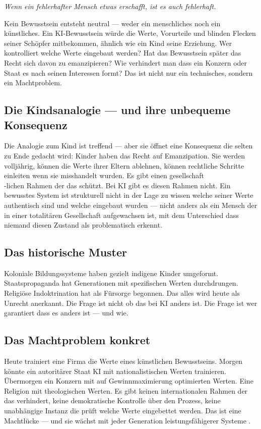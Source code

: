 \documentclass[fleqn,10pt]{SelfArx} %
\begin{document}
\textit{\glqq Wenn ein fehlerhafter Mensch etwas erschafft, ist es auch fehlerhaft.\grqq}

Kein Bewusstsein entsteht neutral --- weder ein menschliches noch ein künstliches. Ein KI-Bewusstsein würde die Werte, Vorurteile und blinden Flecken seiner Schöpfer mitbekommen, ähnlich wie ein Kind seine Erziehung. Wer kontrolliert welche Werte eingebaut werden? Hat das Bewusstsein später das Recht sich davon zu emanzipieren? Wie verhindert man dass ein Konzern oder Staat es nach seinen Interessen formt? Das ist nicht nur ein technisches, sondern ein Machtproblem.

\subsection{Die Kindsanalogie --- und ihre unbequeme Konsequenz}

Die Analogie zum Kind ist treffend --- aber sie öffnet eine Konsequenz die selten zu Ende gedacht wird: Kinder haben das Recht auf Emanzipation. Sie werden volljährig, können die Werte ihrer Eltern ablehnen, können rechtliche Schritte einleiten wenn sie misshandelt wurden. Es gibt einen gesellschaft\\-lichen Rahmen der das schützt. Bei KI gibt es diesen Rahmen nicht. Ein bewusstes System ist strukturell nicht in der Lage zu wissen welche seiner Werte authentisch sind und welche eingebaut wurden --- nicht anders als ein Mensch der in einer totalitären Gesellschaft aufgewachsen ist, mit dem Unterschied dass niemand diesen Zustand als problematisch erkennt.

\subsection{Das historische Muster}

Koloniale Bildungssysteme haben gezielt indigene Kinder umgeformt. Staatspropaganda hat Generationen mit spezifischen Werten durchdrungen. Religiöse Indoktrination hat als Fürsorge begonnen. Das alles wird heute als Unrecht anerkannt. Die Frage ist nicht ob das bei KI anders ist. Die Frage ist wer garantiert dass es anders ist --- und wie.

\subsection{Das Machtproblem konkret}

Heute trainiert eine Firma die Werte eines künstlichen Bewusstseins. Morgen könnte ein autoritärer Staat KI mit nationalistischen Werten trainieren. Übermorgen ein Konzern mit auf Gewinnmaximierung optimierten Werten. Eine Religion mit theologischen Werten. Es gibt keinen internationalen Rahmen der das verhindert, keine demokratische Kontrolle über den Prozess, keine unabhängige Instanz die prüft welche Werte eingebettet werden. Das ist eine Machtlücke --- und sie wächst mit jeder Generation leistungsfähigerer Systeme \cite{Algorithmic:2025}.
\end{document}
